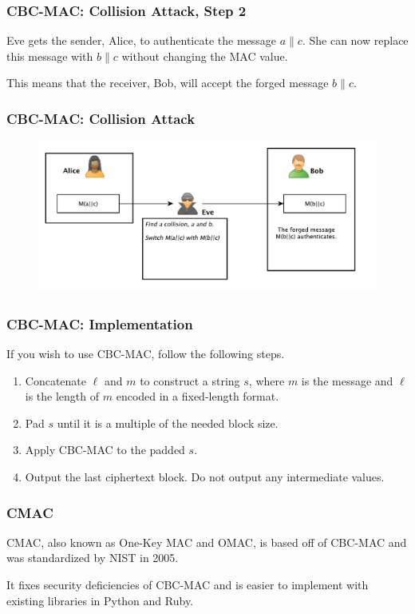 \documentclass{beamer}
\newcommand{\<}{\langle}
\renewcommand{\>}{\rangle}
\begin{document}
\begin{frame}
\frametitle{CBC-MAC: Collision Attack, Step 2}

Eve gets the sender, Alice, to authenticate the message $a\| c$. She can now replace this message with $b\|c$ without changing the MAC value. \newline

This means that the receiver, Bob, will accept the forged message $b\| c$.
\end{frame}


\begin{frame}
\frametitle{CBC-MAC: Collision Attack}

\begin{figure}
\includegraphics[scale=.45]{IMG/collisionattack}
\end{figure}
\end{frame}


\begin{frame}
\frametitle{CBC-MAC: Implementation}

If you wish to use CBC-MAC, follow the following steps.
\begin{enumerate}[1.]
\item Concatenate $\ell$ and $m$ to construct a string $s$, where $m$ is the message and $\ell$ is the length of $m$ encoded in a fixed-length format.
\item Pad $s$ until it is a multiple of the needed block size.
\item Apply CBC-MAC to the padded $s$.
\item Output the last ciphertext block. Do not output any intermediate values.
\end{enumerate}
\end{frame}



\begin{frame}
\frametitle{CMAC}

CMAC, also known as One-Key MAC and OMAC, is based off of CBC-MAC and was standardized by NIST in 2005.\newline

It fixes security deficiencies of CBC-MAC and is easier to implement with existing libraries in Python and Ruby.
\end{frame}
\end{document}

